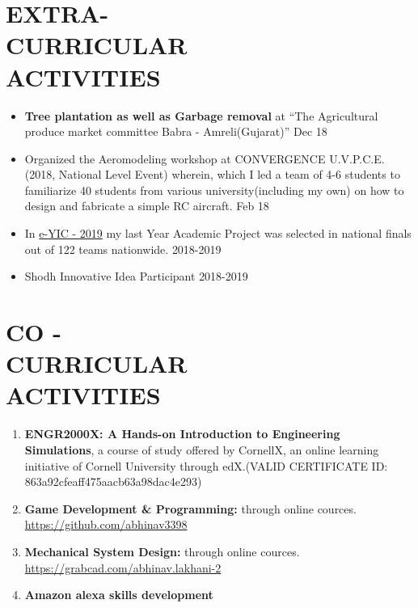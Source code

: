 \documentclass[margin]{res}
\begin{document}
    \section{EXTRA- \\ CURRICULAR \\ ACTIVITIES}
    \begin{itemize}
    \item \textbf{Tree plantation as well as Garbage removal} at “The Agricultural produce market committee Babra - Amreli(Gujarat)” \hfill{Dec 18}
    \item Organized the Aeromodeling workshop at CONVERGENCE U.V.P.C.E.(2018, National Level Event) wherein, which I led a team of 4-6 students to familiarize 40 students from various university(including my own) on how to design and fabricate a simple RC aircraft. \hfill{Feb 18}
    \item In \href{http://e-yantra.org/eyic}{e-YIC - 2019} my last Year Academic Project was selected in national finals out of 122 teams nationwide. \hfill{2018-2019}
    \item Shodh Innovative Idea Participant \hfill{2018-2019}
    \end{itemize}
  
    \section{CO - \\ CURRICULAR \\ ACTIVITIES}
    \begin{enumerate}   
    \item \textbf{ENGR2000X: A Hands-on Introduction to Engineering Simulations}, a course of study offered by CornellX, an online learning initiative of Cornell University through edX.(VALID CERTIFICATE ID: 863a92cfeaff475aacb63a98dac4e293)
    \item \textbf{Game Development \& Programming: } through online cources.\\ \href{https://github.com/abhinav3398}{https://github.com/abhinav3398}
    \item \textbf{Mechanical System Design: } through online cources.\\ \href{https://grabcad.com/abhinav.lakhani-2}{https://grabcad.com/abhinav.lakhani-2}
    \item \textbf{Amazon alexa skills development }
    \end{enumerate}
\end{document}

